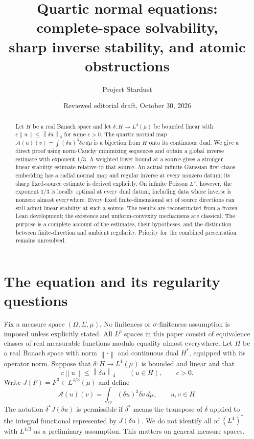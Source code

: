 \documentclass[11pt]{article}
\title{Quartic normal equations: complete-space solvability,\protect\\
sharp inverse stability, and atomic obstructions}
\author{Project Stardust}
\date{Reviewed editorial draft, October 30, 2026}
\theoremstyle{remark}\newtheorem{remark}[theorem]{Remark}
\newcommand{\norm}[1]{\left\lVert#1\right\rVert}
\newcommand{\A}{\mathcal A}
\begin{document}
\maketitle
\begin{abstract}
Let $H$ be a real Banach space and let $\delta:H\to L^4(\mu)$ be bounded
linear with $c\norm{u}\leq\norm{\delta u}_4$ for some $c>0$.
The quartic normal map $\A(u)(v)=\int(\delta u)^3\delta v\,d\mu$
is a bijection from $H$ onto its continuous dual. We give a direct proof
using norm-Cauchy minimizing sequences and obtain a global inverse estimate
with exponent $1/3$. A weighted lower bound at a source gives a stronger
linear stability estimate relative to that source. An actual infinite Gaussian
first-chaos embedding has a radial normal map and regular inverse at every
nonzero datum; its sharp fixed-source estimate is derived explicitly. On infinite Poisson
$L^4$, however, the exponent $1/3$ is locally optimal at every dual datum,
including data whose inverse is nonzero almost everywhere. Every fixed
finite-dimensional set of source directions can still admit linear
stability at such a source. The results are reconstructed from a frozen
Lean development; the existence and uniform-convexity mechanisms are
classical. The purpose is a complete account of the estimates, their
hypotheses, and the distinction between finite-direction and ambient
regularity. Priority for the combined presentation remains unresolved.
\end{abstract}

\section{The equation and its regularity questions}
Fix a measure space $(\Omega,\Sigma,\mu)$. No finiteness or
$\sigma$-finiteness assumption is imposed unless explicitly stated.
All $L^p$ spaces in this paper consist of equivalence classes of real
measurable functions modulo equality almost everywhere. Let $H$ be a
real Banach space with norm $\norm{\cdot}$ and continuous dual $H^*$,
equipped with its operator norm. Suppose that $\delta:H\to L^4(\mu)$
is bounded and linear and that
\begin{equation}\label{eq:lower}
 c\norm{u}\leq\norm{\delta u}_4\qquad(u\in H),\qquad c>0.
\end{equation}
Write $J(F)=F^3\in L^{4/3}(\mu)$ and define
\begin{equation}\label{eq:normal}
 \A(u)(v)=\int_\Omega (\delta u)^3\delta v\,d\mu,
 \qquad u,v\in H.
\end{equation}
The notation $\delta^*J(\delta u)$ is permissible if $\delta^*$ means
the transpose of $\delta$ applied to the integral functional represented
by $J(\delta u)$. We do not identify all of $(L^4)^*$ with $L^{4/3}$
as a preliminary assumption. This matters on general measure spaces.
\end{document}
